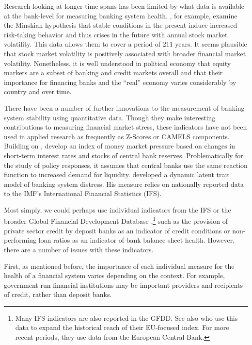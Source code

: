 \documentclass[]{article}
\begin{document}
Research looking at longer time spans has been limited by what data is available at the bank-level for measuring banking system health. \cite{Danielsson2015}, for example, examine the Minskian \citeyearpar{Minsky1982} hypothesis that stable conditions in the present induce increased risk-taking behavior and thus crises in the future with annual stock market volatility. This data allows them to cover a period of 211 years. It seems plausible that stock market volatility is positively associated with broader financial market volatility. Nonetheless, it is well understood in political economy \citep[seminally][]{hall2001introduction} that equity markets are a subset of banking and credit markets overall and that their importance for financing banks and the ``real'' economy varies considerably by country and over time.

There have been a number of further innovations to the measurement of banking system stability using quantitative data. Though they make interesting contributions to measuring financial market stress, these indicators have not been used in applied research as frequently as Z-Scores or CAMELS components. Building on \cite{vonHagen2007}, \cite{Jing2015} develop an index of money market pressure based on changes in short-term interest rates and stocks of central bank reserves. Problematically for the study of policy responses, it assumes that central banks use the same reaction function to increased demand for liquidity. \cite{Rosas2009dltm} developed a dynamic latent trait model of banking system distress. His measure relies on nationally reported data to the IMF's International Financial Statistics (IFS).

Most simply, we could perhaps use individual indicators from the IFS or the broader Global Financial Development Database \citep[GFDD,][]{worldbank2015},\footnote{Many IFS indicators are also reported in the GFDD. See also \cite{duprey2015} who use this data to expand the historical reach of their EU-focused index. For more recent periods, they use data from the European Central Bank.} such as the provision of private sector credit by deposit banks as an indicator of credit conditions or non-performing loan ratios as an indicator of bank balance sheet health. However, there are a number of issues with these indicators.

First, as mentioned before, the importance of each individual measure for the health of a financial system varies depending on the context. For example, government-run financial institutions may be important providers and recipients of credit, rather than deposit banks.
\end{document}
